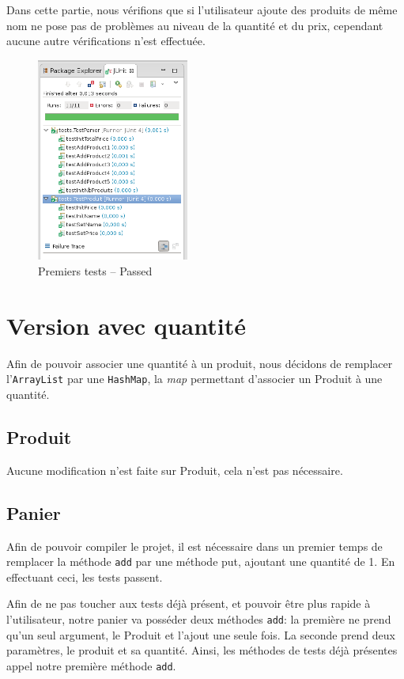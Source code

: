 \documentclass[a4paper, 11pt]{article}
\begin{document}
	\begin{remarque}
		Dans cette partie, nous vérifions que si l'utilisateur ajoute des produits de même nom ne pose pas de problèmes au niveau de la quantité et du prix,
		cependant aucune autre vérifications n'est effectuée.
	\end{remarque}
	\begin{figure}[H]
		\centering
		\includegraphics[width=5cm]{screen1.png}
		\caption{Premiers tests -- Passed}
	\end{figure}

	\section{Version avec quantité}
	Afin de pouvoir associer une quantité à un produit, nous décidons de remplacer l'\texttt{ArrayList} par une \texttt{HashMap}, la \textit{map} permettant d'associer un Produit à une
	quantité.

	\subsection{Produit}
	Aucune modification n'est faite sur Produit, cela n'est pas nécessaire.

	\subsection{Panier}
	Afin de pouvoir compiler le projet, il est nécessaire dans un premier temps de remplacer la méthode \texttt{add} par une méthode put, ajoutant une quantité de 1. En
	effectuant ceci, les tests passent.

	Afin de ne pas toucher aux tests déjà présent, et pouvoir être plus rapide à l'utilisateur, notre panier va posséder deux méthodes \texttt{add}: la première ne prend
	qu'un seul argument, le Produit et l'ajout une seule fois. La seconde prend deux paramètres, le produit et sa quantité. Ainsi, les méthodes de tests déjà
	présentes appel notre première méthode \texttt{add}.
\end{document}
